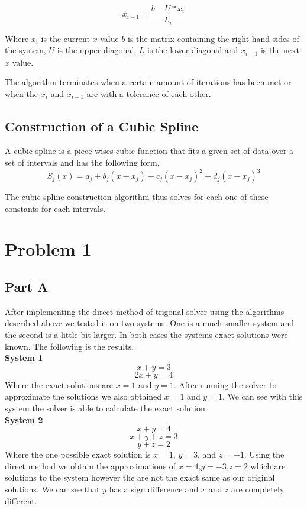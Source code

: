 \documentclass{article}
\begin{document}
$$ x_{i+1} = \frac{b - U*x_i}{L_i}$$ 

Where $x_i$ is the current $x$ value $b$ is the matrix containing the right hand sides of the system, $U$ is the upper diagonal, $L$ is the lower diagonal and $x_{i+1}$ is the next $x$ value. 

The algorithm terminates when a certain amount of iterations has been met or when the $x_i$ and $x_{i+1}$ are with a tolerance of each-other. 

\subsection*{Construction of a Cubic Spline}
A cubic spline is a piece wises cubic function that fits a given set of data over a set of intervals and has the following form, 
$$ S_j (x)=a_j +b_j(x-x_j)+c_j(x-x_j)^2 +d_j(x-x_j)^3$$

The cubic spline construction algorithm thus solves for each one of these constants for each intervals. 

\section*{Problem 1}

\subsection*{Part A}
After implementing the direct method of trigonal solver using the algorithms described above we tested it on two systems. One is a much smaller system and the second is a little bit larger. In both cases the systems exact solutions were known. The following is the results. \\

\textbf{System 1}\\  
$$ x + y = 3 $$  
$$ 2x+y = 4 $$ 
Where the exact solutions are $x=1$ and $y=1$. After running the solver to approximate the solutions we also obtained $x=1$ and $y=1$. We can see with this system the solver is able to calculate the exact solution.  \\

\textbf{System 2}\\
$$ x + y = 4$$ 
$$ x+y+z=3$$ 
$$y+z=2$$
Where the one possible exact solution is $x=1$, $y=3$, and $z=-1$. Using the direct method we obtain the approximations of 
 $x=4$,$y=-3$,$z=2$ which are solutions to the system however the are not the exact same as our original solutions. We can see that $y$ has a sign difference and $x$ and $z$ are completely different. 
\end{document}
